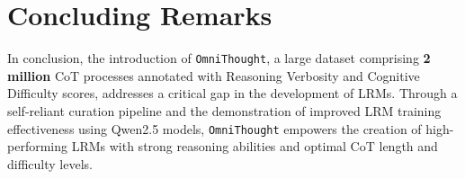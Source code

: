 \documentclass{article}
\begin{document}










\section{Concluding Remarks}

In conclusion, the introduction of \texttt{OmniThought}, a large dataset comprising \textbf{2 million} CoT processes annotated with Reasoning Verbosity and Cognitive Difficulty scores, addresses a critical gap in the development of LRMs. Through a self-reliant curation pipeline and the demonstration of improved LRM training effectiveness using Qwen2.5 models, \texttt{OmniThought} empowers the creation of high-performing LRMs with strong reasoning abilities and optimal CoT length and difficulty levels.
\end{document}
